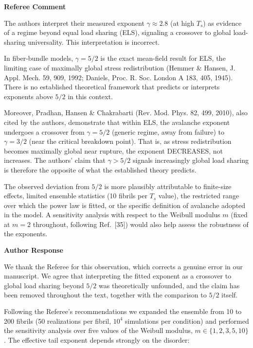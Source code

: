\documentclass[11pt]{article}
\newenvironment{refereecomment}
  {%
    \par
    \begingroup
    \color{commentgray}
    \itshape
    \setlength{\leftskip}{1.4em}
    \setlength{\rightskip}{1.4em}
  }
  {%
    \par
    \endgroup
  }
\newcommand{\refereelabel}{%
  \par\smallskip
  {\color{commentgray}\bfseries Referee Comment}\par
}
\newcommand{\responselabel}{%
  \par\medskip
  {\color{responseblue}\bfseries Author Response}\par
}
\begin{document}
\refereelabel
\begin{refereecomment}
  The authors interpret their measured exponent \(\gamma\approx2.8\) (at high
  \(T_s\)) as evidence of a regime beyond equal load sharing (ELS), signaling a
  crossover to global load-sharing universality. This interpretation is
  incorrect.
  
  In fiber-bundle models, \(\gamma=5/2\) is the exact mean-field result for ELS,
  the limiting case of maximally global stress redistribution (Hemmer \& Hansen,
  J. Appl. Mech. 59, 909, 1992; Daniels, Proc. R. Soc. London A 183, 405, 1945).
  There is no established theoretical framework that predicts or interprets
  exponents above \(5/2\) in this context.
  
  Moreover, Pradhan, Hansen \& Chakrabarti (Rev. Mod. Phys. 82, 499, 2010), also
  cited by the authors, demonstrate that within ELS, the avalanche exponent
  undergoes a crossover from \(\gamma=5/2\) (generic regime, away from failure) to
  \(\gamma=3/2\) (near the critical breakdown point). That is, as stress
  redistribution becomes maximally global near rupture, the exponent DECREASES,
  not increases. The authors' claim that \(\gamma>5/2\) signals increasingly
  global load sharing is therefore the opposite of what the established theory
  predicts.
  
  The observed deviation from \(5/2\) is more plausibly attributable to
  finite-size effects, limited ensemble statistics (10 fibrils per \(T_s\) value),
  the restricted range over which the power law is fitted, or the specific
  definition of avalanche adopted in the model. A sensitivity analysis with
  respect to the Weibull modulus \(m\) (fixed at \(m=2\) throughout, following
  Ref.~[35]) would also help assess the robustness of the exponents.
\end{refereecomment}

\responselabel

We thank the Referee for this observation, which corrects a genuine error in our
manuscript. We agree that interpreting the fitted exponent as a crossover to
global load sharing beyond $5/2$ was theoretically unfounded, and the claim has
been removed throughout the text, together with the comparison to $5/2$ itself.

Following the Referee's recommendations we expanded the ensemble from 10 to 200
fibrils (50 realizations per fibril, $10^4$ simulations per condition) and
performed the sensitivity analysis over five values of the Weibull modulus,
$m\in\{1,2,3,5,10\}$. The effective tail exponent depends strongly on the
disorder:
\end{document}
